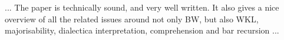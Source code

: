 ... The paper is technically sound, and very well written. It also gives a nice
overview of all the related issues around not only BW, but also WKL, majorisability,
dialectica interpretation, comprehension and bar recursion ...